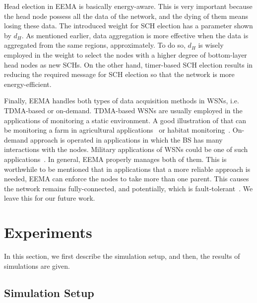 \documentclass[journal]{IEEEtran}
\begin{document}
Head election in EEMA is basically energy-aware.  This is very important because the head node possess all the data of the network, and the dying of them means losing these data.  The introduced weight for SCH election has a parameter shown by $d_{H}$.  As mentioned earlier, data aggregation is more effective when the data is aggregated from the same regions, approximately.  To do so, $d_{H}$ is wisely employed in the weight to select the nodes with a higher degree of bottom-layer head nodes as new SCHs.  On the other hand, timer-based SCH election results in reducing the required message for SCH election so that the network is more energy-efficient.

Finally, EEMA handles both types of data acquisition methods in WSNs, i.e. TDMA-based or on-demand.  TDMA-based WSNs are usually employed in the applications of monitoring a static environment.  A good illustration of that can be monitoring a farm in agricultural applications~\cite{survey-app} or habitat monitoring~\cite{habitat}.  On-demand approach is operated in applications in which the BS has many interactions with the nodes.  Military applications of WSNs could be one of such applications~\cite{survey-app}.  In general, EEMA properly manages both of them.  This is worthwhile to be mentioned that in applications that a more reliable approach is needed, EEMA can enforce the nodes to take more than one parent.  This causes the network remains fully-connected, and potentially, which is fault-tolerant~\cite{paradis2007}.  We leave this for our future work.

\section{Experiments}
\label{sec:exp}

In this section, we first describe the simulation setup, and then, the results of simulations are given.

\subsection{Simulation Setup}
\label{subsec:sim-set} 
\end{document}
